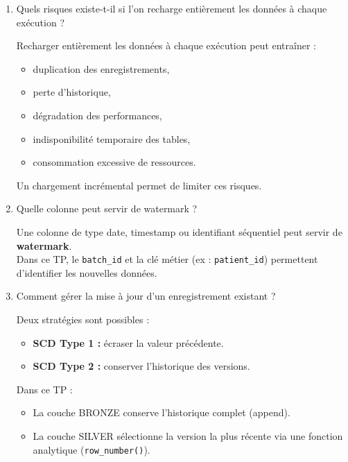\documentclass[11pt,a4paper]{article}
\begin{document}
\begin{enumerate}
  \item Quels risques existe-t-il si l’on recharge entièrement les données à chaque exécution ?
    \begin{tcolorbox}[title=\textbf{Correction — Risques d’un rechargement complet}, colback=gray!5, colframe=black]
    Recharger entièrement les données à chaque exécution peut entraîner :

    \begin{itemize}
      \item duplication des enregistrements,
      \item perte d’historique,
      \item dégradation des performances,
      \item indisponibilité temporaire des tables,
      \item consommation excessive de ressources.
    \end{itemize}

    Un chargement incrémental permet de limiter ces risques.
    \end{tcolorbox}
  \item Quelle colonne peut servir de watermark ?
    \begin{tcolorbox}[title=\textbf{Correction — Watermark}, colback=gray!5, colframe=black]
    Une colonne de type date, timestamp ou identifiant séquentiel peut servir de \textbf{watermark}.\\
    Dans ce TP, le \texttt{batch\_id} et la clé métier (ex : \texttt{patient\_id})
    permettent d’identifier les nouvelles données.
    \end{tcolorbox}
  \item Comment gérer la mise à jour d’un enregistrement existant ?
    \begin{tcolorbox}[title=\textbf{Correction — Gestion des mises à jour}, colback=gray!5, colframe=black]
    Deux stratégies sont possibles :

    \begin{itemize}
      \item \textbf{SCD Type 1 :} écraser la valeur précédente.
      \item \textbf{SCD Type 2 :} conserver l’historique des versions.
    \end{itemize}

    Dans ce TP :
    \begin{itemize}
      \item La couche BRONZE conserve l’historique complet (append).
      \item La couche SILVER sélectionne la version la plus récente
      via une fonction analytique (\texttt{row\_number()}).
    \end{itemize}
    \end{tcolorbox}
\end{enumerate}
\end{document}
